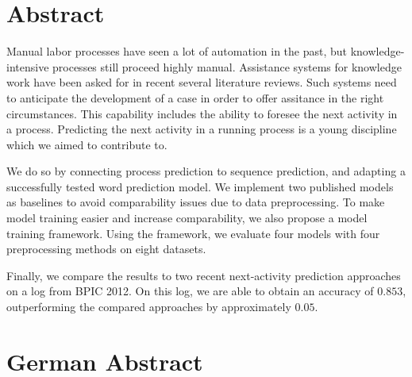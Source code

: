 


\begingroup
\let\clearpage\relax
\let\cleardoublepage\relax
\let\cleardoublepage\relax

\chapter*{Abstract}
Manual labor processes have seen a lot of automation in the past, but knowledge-intensive processes still proceed highly manual.
Assistance systems for knowledge work have been asked for in recent several literature reviews.
Such systems need to anticipate the development of a case in order to offer assitance in the right circumstances.
This capability includes the ability to foresee the next activity in a process.
Predicting the next activity in a running process is a young discipline which we aimed to contribute to.

We do so by connecting process prediction to sequence prediction, and adapting a successfully tested word prediction model.
We implement two published models as baselines to avoid comparability issues due to data preprocessing.
To make model training easier and increase comparability, we also propose a model training framework.
Using the framework, we evaluate four models with four preprocessing methods on eight datasets.

Finally, we compare the results to two recent next-activity prediction approaches on a log from BPIC 2012. On this log, we are able to obtain an accuracy of $0.853$, outperforming the compared approaches by approximately $0.05$.

\vfill

\chapter*{German Abstract}

\endgroup

\vfill
